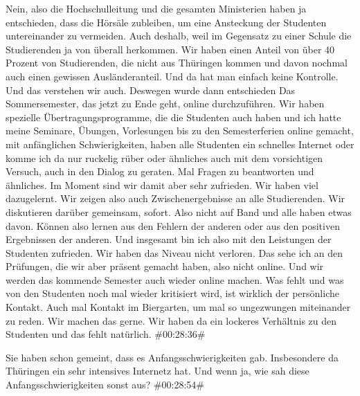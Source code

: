\begin{description}
\Andre Nein, also die Hochschulleitung und die gesamten Ministerien haben ja entschieden, dass die Hörsäle zubleiben, um eine Ansteckung der Studenten untereinander zu vermeiden. Auch deshalb, weil im Gegensatz zu einer Schule die Studierenden ja von überall herkommen. Wir haben einen Anteil von über 40 Prozent von Studierenden, die nicht aus Thüringen kommen und davon nochmal auch einen gewissen Ausländeranteil. Und da hat man einfach keine Kontrolle. Und das verstehen wir auch. Deswegen wurde dann entschieden Das Sommersemester, das jetzt zu Ende geht, online durchzuführen. Wir haben spezielle Übertragungsprogramme, die die Studenten auch haben und ich hatte meine Seminare, Übungen, Vorlesungen bis zu den Semesterferien online gemacht, mit anfänglichen Schwierigkeiten, haben alle Studenten ein schnelles Internet oder komme ich da nur ruckelig rüber oder ähnliches auch mit dem vorsichtigen Versuch, auch in den Dialog zu geraten. Mal Fragen zu beantworten und ähnliches. Im Moment sind wir damit aber sehr zufrieden. Wir haben viel dazugelernt. Wir zeigen also auch Zwischenergebnisse an alle Studierenden. Wir diskutieren darüber gemeinsam, sofort. Also nicht auf Band und alle haben etwas davon. Können also lernen aus den Fehlern der anderen oder aus den positiven Ergebnissen der anderen. Und insgesamt bin ich also mit den Leistungen der Studenten zufrieden. Wir haben das Niveau nicht verloren. Das sehe ich an den Prüfungen, die wir aber präsent gemacht haben, also nicht online. Und wir werden das kommende Semester auch wieder online machen. Was fehlt und was von den Studenten noch mal wieder kritisiert wird, ist wirklich der persönliche Kontakt. Auch mal Kontakt im Biergarten, um mal so ungezwungen miteinander zu reden. Wir machen das gerne. Wir haben da ein lockeres Verhältnis zu den Studenten und das fehlt natürlich. \#00:28:36\#

\Fabian Sie haben schon gemeint, dass es Anfangsschwierigkeiten gab. Insbesondere da Thüringen ein sehr intensives Internetz hat. Und wenn ja, wie sah diese Anfangsschwierigkeiten sonst aus? \#00:28:54\#


\end{description}
